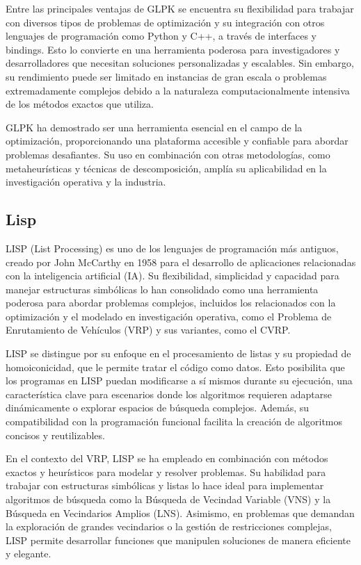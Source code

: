 \documentclass{article}
\begin{document}
Entre las principales ventajas de GLPK se encuentra su flexibilidad para trabajar con diversos tipos de problemas de optimización y su integración con otros lenguajes de programación como Python y C++, a través de interfaces y bindings. Esto lo convierte en una herramienta poderosa para investigadores y desarrolladores que necesitan soluciones personalizadas y escalables. Sin embargo, su rendimiento puede ser limitado en instancias de gran escala o problemas extremadamente complejos debido a la naturaleza computacionalmente intensiva de los métodos exactos que utiliza.

GLPK ha demostrado ser una herramienta esencial en el campo de la optimización, proporcionando una plataforma accesible y confiable para abordar problemas desafiantes. Su uso en combinación con otras metodologías, como metaheurísticas y técnicas de descomposición, amplía su aplicabilidad en la investigación operativa y la industria.

\subsection{Lisp}
LISP (List Processing) es uno de los lenguajes de programación más antiguos, creado por John McCarthy en 1958 para el desarrollo de aplicaciones relacionadas con la inteligencia artificial (IA). Su flexibilidad, simplicidad y capacidad para manejar estructuras simbólicas lo han consolidado como una herramienta poderosa para abordar problemas complejos, incluidos los relacionados con la optimización y el modelado en investigación operativa, como el Problema de Enrutamiento de Vehículos (VRP) y sus variantes, como el CVRP.

LISP se distingue por su enfoque en el procesamiento de listas y su propiedad de homoiconicidad, que le permite tratar el código como datos. Esto posibilita que los programas en LISP puedan modificarse a sí mismos durante su ejecución, una característica clave para escenarios donde los algoritmos requieren adaptarse dinámicamente o explorar espacios de búsqueda complejos. Además, su compatibilidad con la programación funcional facilita la creación de algoritmos concisos y reutilizables.

En el contexto del VRP, LISP se ha empleado en combinación con métodos exactos y heurísticos para modelar y resolver problemas. Su habilidad para trabajar con estructuras simbólicas y listas lo hace ideal para implementar algoritmos de búsqueda como la Búsqueda de Vecindad Variable (VNS) y la Búsqueda en Vecindarios Amplios (LNS). Asimismo, en problemas que demandan la exploración de grandes vecindarios o la gestión de restricciones complejas, LISP permite desarrollar funciones que manipulen soluciones de manera eficiente y elegante.
\end{document}
